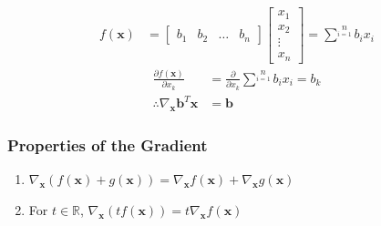 \documentclass[letterpaper,12pt]{article}
\newcommand{\vect}[1]{\mathbf{#1}}
\begin{document}
\begin{itemize}
       \begin{align}
        f(\vect{x}) & = \begin{bmatrix}
         b_1 & b_2 & \dots & b_n
        \end{bmatrix}
        \begin{bmatrix}
         x_1    \\
         x_2    \\
         \vdots \\
         x_n
        \end{bmatrix} = \sum\limits^{n}\limits_{i=1} b_i x_i
       \end{align}
       \begin{align}
        \frac{\partial f(\vect{x})}{\partial x_k}        & = \frac{\partial}{\partial x_k} \sum\limits^{n}\limits_{i=1} b_i x_i = b_k \\
        \therefore \nabla_{\vect{x}} \vect{b}^T \vect{x} & = \vect{b}
       \end{align}
\end{itemize}

\subsubsection{Properties of the Gradient}
\begin{enumerate}
 \item $\nabla_{\vect{x}} (f(\vect{x}) + g(\vect{x})) = \nabla_{\vect{x}} f(\vect{x}) + \nabla_{\vect{x}} g(\vect{x})$
 \item For $t \in \mathbb{R}$, $\nabla_{\vect{x}} (t f(\vect{x})) = t \nabla_{\vect{x}} f(\vect{x})$
\end{enumerate}
\end{document}

